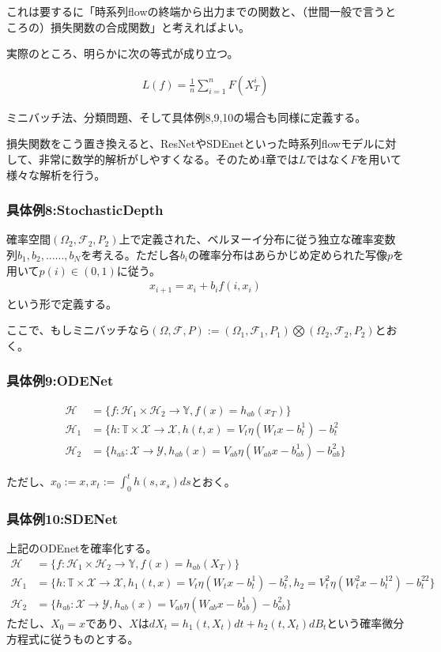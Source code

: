 \documentclass{jsarticle}
\begin{document}
これは要するに「時系列flowの終端から出力までの関数と、（世間一般で言うところの）損失関数の合成関数」と考えればよい。

実際のところ、明らかに次の等式が成り立つ。

\begin{align}
L(f)=\frac{1}{n}\sum^n_{i=1} F(X^i_T)
\end{align}

ミニバッチ法、分類問題、そして具体例8,9,10の場合も同様に定義する。

損失関数をこう置き換えると、ResNetやSDEnetといった時系列flowモデルに対して、非常に数学的解析がしやすくなる。そのため4章では$L$ではなく$F$を用いて様々な解析を行う。


\subsubsection{具体例8:StochasticDepth}
確率空間$(\Omega_2,\mathcal{F}_2,P_2)$上で定義された、ベルヌーイ分布に従う独立な確率変数列$b_1,b_2,......,b_N$を考える。ただし各$b_i$の確率分布はあらかじめ定められた写像$p$を用いて$p(i)\in(0,1)$に従う。
\begin{align}
x_{i+1}=x_{i}+b_i f(i,x_i)
\end{align}
という形で定義する。

ここで、もしミニバッチなら$(\Omega,\mathcal{F},P):=(\Omega_1,\mathcal{F}_1,P_1)\bigotimes(\Omega_2,\mathcal{F}_2,P_2)$とおく。

\subsubsection{具体例9:ODENet}
\begin{align}
\mathcal{H}&=\{f:\mathcal{H}_1\times\mathcal{H}_2\to\mathbb{Y},f(x)=h_{ab}(x_T)\}\\
\mathcal{H}_1&=\{h:\mathbb{T}\times\mathcal{X}\to\mathcal{X},h(t,x)=V_t\eta(W_tx-b^1_t)-b_t^2\\
\mathcal{H}_2&=\{h_{ab}:\mathcal{X}\to\mathcal{Y},h_{ab}(x)=V_{ab}\eta(W_{ab}x-b^1_{ab})-b^2_{ab}\}
\end{align}

ただし、$x_0:=x,x_t:=\int^t_0 h(s,x_s)ds$とおく。

\subsubsection{具体例10:SDENet}
上記のODEnetを確率化する。
\begin{align}
\mathcal{H}&=\{f:\mathcal{H}_1\times\mathcal{H}_2\to\mathbb{Y},f(x)=h_{ab}(X_T)\}\\
\mathcal{H}_1&=\{h:\mathbb{T}\times\mathcal{X}\to\mathcal{X},h_1(t,x)=V_t\eta(W_tx-b^1_t)-b_t^2,h_2=V^2_t\eta(W^2_tx-b^{12}_t)-b_t^{22}\}\\
\mathcal{H}_2&=\{h_{ab}:\mathcal{X}\to\mathcal{Y},h_{ab}(x)=V_{ab}\eta(W_{ab}x-b^1_{ab})-b^2_{ab}\}
\end{align}
ただし、$X_0=x$であり、$X$は$dX_t=h_1(t,X_t)dt+h_2(t,X_t)dB_t$という確率微分方程式に従うものとする。
\end{document}
